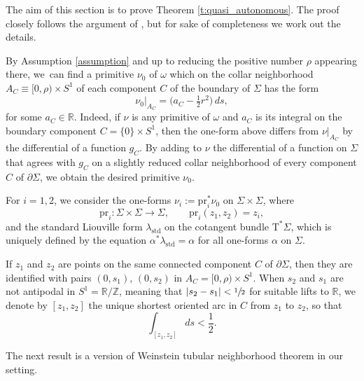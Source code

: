 \documentclass[10pt,a4paper]{article}
\let\mathds\mathbb
\theoremstyle{definition}
\newcommand{\pr}{\mathrm{pr}}
\newcommand{\Tan}{\mathrm{T}}
\newcommand{\Z}{\mathds{Z}}
\newcommand{\R}{\mathds{R}}
\let\diff d
\begin{document}
The aim of this section is to prove Theorem \ref{t:quasi_autonomous}. The proof closely follows the argument of \cite[\S 4]{Benedetti:2021aa}, but for sake of completeness we work out the details.

By Assumption \ref{assumption} and up to reducing the positive number $\rho$ appearing there, we~can find a primitive $\nu_0$ of $\omega$ which on the collar neighborhood $A_C\equiv [0,\rho)\times S^1$ of each component $C$ of the boundary of $\Sigma$ has the form
\begin{equation}
\label{e:lambda|_A}
\nu_0|_{A_C} = \bigl( a_C - \tfrac{1}{2} r^2 \bigr)\, ds,
\end{equation}
for some $a_C\in \R$. Indeed, if $\nu$ is any primitive of $\omega$ and $a_C$ is its integral on the boundary component $C = \{0\} \times S^1$, then the one-form above differs from $\nu|_{A_C}$ by the differential of a function $g_C$. By adding to $\nu$ the differential of a function on $\Sigma$ that agrees with $g_C$ on a slightly reduced collar neighborhood of every component $C$ of $\partial \Sigma$, we obtain the desired primitive $\nu_0$.

For $i=1,2$, we consider the one-forms $\nu_i:=\pr_i^*\nu_0$ on $\Sigma\times\Sigma$, where
\[
\pr_i:\Sigma\times\Sigma\to\Sigma, \qquad \pr_i(z_1,z_2)=z_i,
\]
and the standard Liouville form $\lambda_{\mathrm{std}}$ on the cotangent bundle $\Tan^*\Sigma$, which is uniquely defined by the equation $\alpha^*\lambda_{\mathrm{std}}=\alpha$ for all one-forms $\alpha$ on $\Sigma$.

If $z_1$ and $z_2$ are points on the same connected component $C$ of $\partial \Sigma$, then they are identified with pairs $(0,s_1)$, $(0,s_2)$ in $A_C=[0,\rho)\times S^1$. When $s_2$ and $s_1$ are not antipodal in $S^1=\R/\Z$, meaning that $|s_2-s_1|< \sfrac 12$ for suitable lifts to $\R$, we denote by $[z_1,z_2]$ the unique shortest oriented arc in $C$ from $z_1$ to $z_2$, so that
\[
\int_{[z_1,z_2]} \!\!\! \diff s < \frac12.
\]

The next result is a version of Weinstein tubular neighborhood theorem in our setting.
\end{document}
